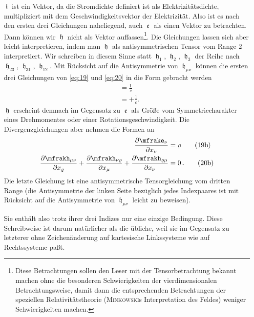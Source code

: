 $\mfraki$ ist ein Vektor, da die Stromdichte definiert ist als 
Elektrizitätsdichte, multipliziert mit dem Geschwindigkeitsvektor der 
Elektrizität. Also ist es nach den ersten drei Gleichungen naheliegend, 
auch $\mfrake$ als einen Vektor zu betrachten. Dann können wir $\mfrakh$ nicht 
als Vektor auffassen\footnote{Diese Betrachtungen sollen den Leser mit der 
Tensorbetrachtung bekannt machen ohne die besonderen Schwierigkeiten der 
vierdimensionalen Betrachtungsweise, damit dann die entsprechenden 
Betrachtungen der speziellen Relativitätstheorie (\textsc{Minkowski}s 
Interpretation des Feldes) weniger Schwierigkeiten machen.}. Die Gleichungen 
lassen sich aber leicht interpretieren, indem man $\mfrakh$ als 
antisymmetrischen Tensor vom Range $2$ interpretiert. Wir schreiben in diesem 
Sinne statt $\mfrakh_{1}$, $\mfrakh_{2}$, $\mfrakh_{3}$ der Reihe nach 
$\mfrakh_{23}$, $\mfrakh_{31}$, $\mfrakh_{12}$. Mit Rücksicht auf die 
Antisymmetrie von $\mfrakh_{\mu\nu}$ können die ersten drei Gleichungen von 
\eqref{eq:19} und \eqref{eq:20} in die Form gebracht werden
\begin{align}
	&= \frac{1}{c}
	\tag{19a} \\
	&= +\frac{1}{c}.
	\tag{20a}
\end{align}
$\mfrakh$ erscheint demnach im Gegensatz zu $\mfrake$ als Größe vom 
Symmetriecharakter eines Drehmomentes oder einer Rotationsgeschwindigkeit. Die 
Divergenzgleichungen aber nehmen die Formen an
\begin{align}
	\frpa{\mfrake_{\nu}}{x_{\nu}}&= \varrho
	\tag{19b} \\
	\frpa{\mfrakh_{\mu\nu}}{x_{\varrho}} +
	\frpa{\mfrakh_{\nu\varrho}}{x_{\mu}} +
	\frpa{\mfrakh_{\varrho\mu}}{x_{\nu}} &= 0\,.
	\tag{20b}
\end{align}
Die letzte Gleichung ist eine antisymmetrische Tensorgleichung vom dritten Range 
(die Antisymmetrie der linken Seite bezüglich jedes Indexpaares ist mit 
Rücksicht auf die Antisymmetrie von $\mfrakh_{\mu\nu}$ leicht zu beweisen).

Sie enthält also trotz ihrer drei Indizes nur eine einzige Bedingung. Diese 
Schreibweise ist darum natürlicher als die übliche, weil sie im Gegensatz zu 
letzterer ohne Zeichenänderung auf kartesische Linkssysteme wie auf 
Rechtssysteme paßt.